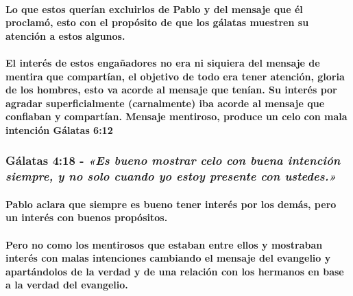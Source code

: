 \documentclass[11a pt,twoside]{article}
\newcommand{\scripture}[1]{%
  {\fontsize{12pt}{16pt}\selectfont\ScriptureFont\itshape #1}%
}
\let\oldsubsubsection\subsubsection
\renewcommand{\subsubsection}{\needspace{4\baselineskip}\oldsubsubsection}
\let\oldparagraph\paragraph
\renewcommand{\paragraph}{\needspace{3\baselineskip}\oldparagraph}
\begin{document}
\paragraph{Lo que estos querían excluirlos de Pablo y del mensaje que él
proclamó, esto con el propósito de que los gálatas muestren su atención
a estos
algunos.}\label{lo-que-estos-queruxedan-excluirlos-de-pablo-y-del-mensaje-que-uxe9l-proclamuxf3-esto-con-el-propuxf3sito-de-que-los-guxe1latas-muestren-su-atenciuxf3n-a-estos-algunos.}

\paragraph{El interés de estos engañadores no era ni siquiera del
mensaje de mentira que compartían, el objetivo de todo era tener
atención, gloria de los hombres, esto va acorde al mensaje que tenían.
Su interés por agradar superficialmente (carnalmente) iba acorde al
mensaje que confiaban y compartían. Mensaje mentiroso, produce un celo
con mala intención Gálatas
6:12}\label{el-interuxe9s-de-estos-engauxf1adores-no-era-ni-siquiera-del-mensaje-de-mentira-que-compartuxedan-el-objetivo-de-todo-era-tener-atenciuxf3n-gloria-de-los-hombres-esto-va-acorde-al-mensaje-que-tenuxedan.-su-interuxe9s-por-agradar-superficialmente-carnalmente-iba-acorde-al-mensaje-que-confiaban-y-compartuxedan.-mensaje-mentiroso-produce-un-celo-con-mala-intenciuxf3n-guxe1latas-612}

\subsubsection{\texorpdfstring{Gálatas 4:18 -
\scripture{«Es bueno mostrar celo con buena intención siempre, y no solo cuando yo estoy presente con ustedes.»}}{Gálatas 4:18 - }}\label{guxe1latas-418---es-bueno-mostrar-celo-con-buena-intenciuxf3n-siempre-y-no-solo-cuando-yo-estoy-presente-con-ustedes.}

\paragraph{Pablo aclara que siempre es bueno tener interés por los
demás, pero un interés con buenos
propósitos.}\label{pablo-aclara-que-siempre-es-bueno-tener-interuxe9s-por-los-demuxe1s-pero-un-interuxe9s-con-buenos-propuxf3sitos.}

\paragraph{Pero no como los mentirosos que estaban entre ellos y
mostraban interés con malas intenciones cambiando el mensaje del
evangelio y apartándolos de la verdad y de una relación con los hermanos
en base a la verdad del
evangelio.}\label{pero-no-como-los-mentirosos-que-estaban-entre-ellos-y-mostraban-interuxe9s-con-malas-intenciones-cambiando-el-mensaje-del-evangelio-y-apartuxe1ndolos-de-la-verdad-y-de-una-relaciuxf3n-con-los-hermanos-en-base-a-la-verdad-del-evangelio.}
\end{document}
